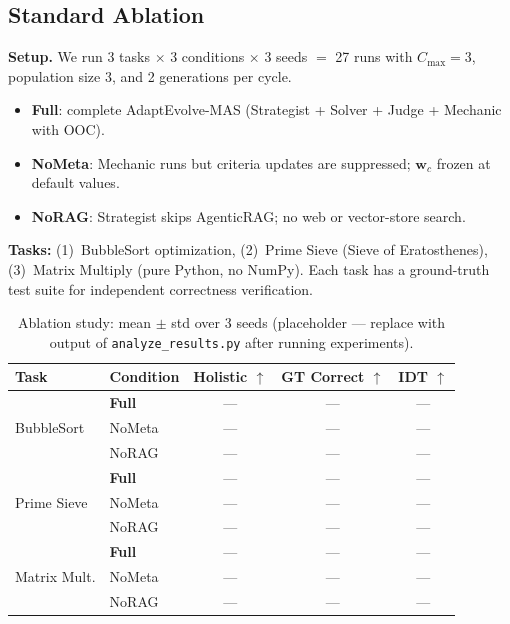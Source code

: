 \documentclass[letterpaper]{article}
\begin{document}
\subsection{Standard Ablation}

\textbf{Setup.}  We run 3 tasks $\times$ 3 conditions $\times$ 3 seeds $=$ 27
runs with $C_{\max} = 3$, population size 3, and 2 generations per cycle.

\begin{itemize}
  \item \textbf{Full}: complete AdaptEvolve-MAS (Strategist + Solver + Judge + Mechanic with OOC).
  \item \textbf{NoMeta}: Mechanic runs but criteria updates are suppressed;
        $\mathbf{w}_c$ frozen at default values.
  \item \textbf{NoRAG}: Strategist skips AgenticRAG; no web or vector-store search.
\end{itemize}

\textbf{Tasks:} (1)~BubbleSort optimization, (2)~Prime Sieve
(Sieve of Eratosthenes), (3)~Matrix Multiply (pure Python, no NumPy).
Each task has a ground-truth test suite for independent correctness
verification.

% 

\begin{table}[t]
\centering
\caption{Ablation study: mean $\pm$ std over 3 seeds (placeholder — replace with
output of \texttt{analyze\_results.py} after running experiments).}
\label{tab:ablation}
\begin{tabular}{llccc}
\toprule
Task & Condition & Holistic $\uparrow$ & GT Correct $\uparrow$ & IDT $\uparrow$ \\
\midrule
\multirow{3}{*}{BubbleSort}
  & \textbf{Full}   & — & — & — \\
  & NoMeta          & — & — & — \\
  & NoRAG           & — & — & — \\
\midrule
\multirow{3}{*}{Prime Sieve}
  & \textbf{Full}   & — & — & — \\
  & NoMeta          & — & — & — \\
  & NoRAG           & — & — & — \\
\midrule
\multirow{3}{*}{Matrix Mult.}
  & \textbf{Full}   & — & — & — \\
  & NoMeta          & — & — & — \\
  & NoRAG           & — & — & — \\
\bottomrule
\end{tabular}
\end{table}
\end{document}

